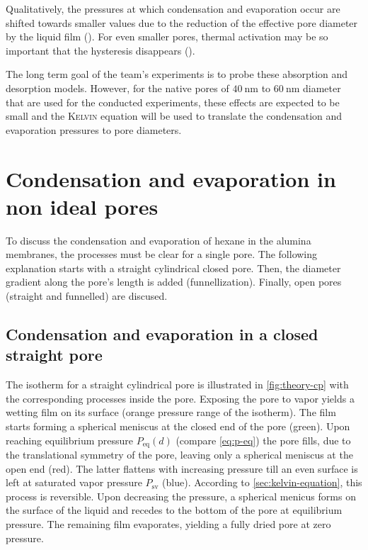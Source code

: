 \documentclass[../thesis.tex]{subfiles}
\begin{document}
      Qualitatively, the pressures at which condensation and evaporation occur are shifted towards smaller values due to the reduction of the effective pore diameter by the liquid film (\cite{Saam1975a}). For even smaller pores, thermal activation may be so important that the hysteresis disappears (\cite{etienne}).
      \medskip

      The long term goal of the team's experiments is to probe these absorption and desorption models. However, for the native pores of $\SI{40}{\nano\meter}$ to $\SI{60}{\nano\meter}$ diameter that are used for the conducted experiments, these effects are expected to be small and the \textsc{Kelvin} equation will be used to translate the condensation and evaporation pressures to pore diameters.


    \section{Condensation and evaporation in non ideal pores}
    \label{eq:cond-evap-non-ideal-pore}

      To discuss the condensation and evaporation of hexane in the alumina membranes, the processes must be clear for a single pore. The following explanation starts with a straight cylindrical closed pore. Then, the diameter gradient along the pore's length is added (funnellization). Finally, open pores (straight and funnelled) are discused.

      \subsection{Condensation and evaporation in a closed straight pore}
      \label{subsec:closed-pore-theory}

        The isotherm for a straight cylindrical pore is illustrated in \cref{fig:theory-cp} with the corresponding processes inside the pore. Exposing the pore to vapor yields a wetting film on its surface (orange pressure range of the isotherm). The film starts forming a spherical meniscus at the closed end of the pore (green). Upon reaching equilibrium pressure $P_\mathrm{eq}(d)$ (compare \cref{eq:p-eq}) the pore fills, due to the translational symmetry of the pore, leaving only a spherical meniscus at the open end (red). The latter flattens with increasing pressure till an even surface is left at saturated vapor pressure $P_\mathrm{sv}$ (blue). According to \cref{sec:kelvin-equation}, this process is reversible. Upon decreasing the pressure, a spherical menicus forms on the surface of the liquid and recedes to the bottom of the pore at equilibrium pressure. The remaining film evaporates, yielding a fully dried pore at zero pressure.
\end{document}
